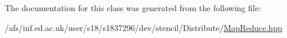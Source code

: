 The documentation for this class was generated from the following file\-:\begin{DoxyCompactItemize}
\item 
/afs/inf.\-ed.\-ac.\-uk/user/s18/s1837296/dev/stencil/\-Distribute/\hyperlink{MapReduce_8hpp}{Map\-Reduce.\-hpp}\end{DoxyCompactItemize}
